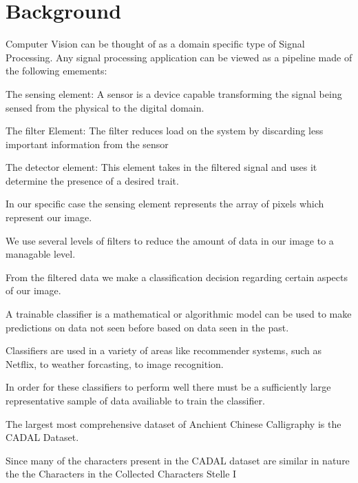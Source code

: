 \chapter{Background}

Computer Vision can be thought of as a domain specific type of Signal Processing.  Any signal processing application can be viewed as a pipeline made of the following emements:

The sensing element:  A sensor is a device capable transforming the signal being sensed from the physical to the digital domain.

The filter Element:  The filter reduces load on the system by discarding less important information from the sensor

The detector element:  This element takes in the filtered signal and uses it determine the presence of a desired trait.




In our specific case the sensing element represents the array of pixels which represent our image.

We use several levels of filters to reduce the amount of data in our image to a managable level.

From the filtered data we make a classification decision regarding certain aspects of our image.

A trainable classifier is a mathematical or algorithmic model can be used to make predictions on data not seen before based on data seen in the past.

Classifiers are used in a variety of areas like recommender systems, such as Netflix, to weather forcasting, to image recognition.

In order for these classifiers to perform well there must be a sufficiently large representative sample of data availiable to train the classifier.


The largest most comprehensive dataset of Anchient Chinese Calligraphy is the CADAL Dataset.

Since many of the characters present in the CADAL dataset are similar in nature the the Characters in the Collected Characters Stelle I 
